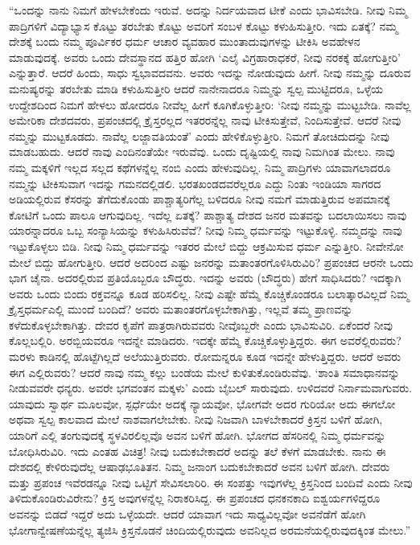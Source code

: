  “ಒಂದನ್ನು ನಾನು ನಿಮಗೆ ಹೇಳಬೇಕೆಂದು ಇರುವೆ. ಅದನ್ನು ನಿರ್ದಯವಾದ ಟೀಕೆ ಎಂದು ಭಾವಿಸಬೇಡಿ. ನೀವು ನಿಮ್ಮ ಪಾದ್ರಿಗಳಿಗೆ ವಿದ್ಯಾಭ್ಯಾಸ ಕೊಟ್ಟು ತರಬೇತು ಕೊಟ್ಟು ಅವರಿಗೆ ಸಂಬಳ ಕೊಟ್ಟು ಕಳುಹಿಸುತ್ತೀರಿ. ಇದು ಏತಕ್ಕೆ? ನಮ್ಮ ದೇಶಕ್ಕೆ ಬಂದು ನಮ್ಮ ಪೂರ್ವಿಕರ ಧರ್ಮ ಆಚಾರ ವ್ಯವಹಾರ ಮುಂತಾದುವುಗಳನ್ನು ಟೀಕಿಸಿ ಅವಹೇಳನ ಮಾಡುವುದಕ್ಕೆ. ಅವರು ಒಂದು ದೇವಸ್ಥಾನದ ಹತ್ತಿರ ಹೋಗಿ ‘ಎಲೈ ವಿಗ್ರಹಾರಾಧಕರೆ, ನೀವು ನರಕಕ್ಕೆ ಹೋಗುತ್ತೀರಿ’ ಎನ್ನುತ್ತಾರೆ. ಆದರೆ ಹಿಂದು, ಸಾಧು ಸ್ವಭಾವದವನು. ಅವರು ಇದನ್ನು ನೋಡುವುದು ಹೀಗೆ. ನೀವು ನಮ್ಮನ್ನು ದೂರುವ ಮನುಷ್ಯರನ್ನು ತರಬೇತು ಮಾಡಿ ಕಳುಹಿಸುತ್ತೀರಿ ಆದರೆ ನಾನೇನಾದರೂ ನಿಮ್ಮನ್ನು ಸ್ವಲ್ಪ ಮುಟ್ಟಿದರೂ, ಒಳ್ಳೆಯ ಉದ್ದೇಶದಿಂದ ನಿಮಗೆ ಹೇಳಲು ಹೋದರೂ ನೀವೆಲ್ಲ ಹೀಗೆ ಕೂಗಿಕೊಳ್ಳುತ್ತೀರಿ: ‘ನೀವು ನಮ್ಮನ್ನು ಮುಟ್ಟಬೇಡಿ. ನಾವೆಲ್ಲ ಅಮೇರಿಕಾ ದೇಶದವರು, ಪ್ರಪಂಚದಲ್ಲಿ ಕ್ರೈಸ್ತರಲ್ಲದ ಇತರರನ್ನೆಲ್ಲ ನಾವು ಟೀಕಿಸುತ್ತೇವೆ, ನಿಂದಿಸುತ್ತೇವೆ. ಆದರೆ ನೀವು ನಮ್ಮನ್ನು ಮುಟ್ಟಕೂಡದು. ನಾವೆಲ್ಲ ಲಜ್ಜಾವತಿಯಂತೆ’ ಎಂದು ಹೇಳಿಕೊಳ್ಳುತ್ತೀರಿ. ನಿಮಗೆ ತೋಚಿದುದನ್ನು ನೀವು ಮಾಡಬಹುದು. ಆದರೆ ನಾವು ಎಂದಿನಂತೆಯೇ ಇರುವೆವು. ಒಂದು ದೃಷ್ಟಿಯಲ್ಲಿ ನಾವು ನಿಮಗಿಂತ ಮೇಲು. ನಾವು ನಮ್ಮ ಮಕ್ಕಳಿಗೆ ಇಲ್ಲದ ಸಲ್ಲದ ಕಥೆಗಳನ್ನೆಲ್ಲ ನಂಬಿ ಎಂದು ಹೇಳುವುದಿಲ್ಲ. ನಿಮ್ಮ ಪಾದ್ರಿಗಳು ಯಾವಾಗಲಾದರೂ ನಮ್ಮನ್ನು ಟೀಕಿಸುವಾಗ ಇದನ್ನು ಗಮನದಲ್ಲಿಡಲಿ. ಭರತಖಂಡದವರೆಲ್ಲರೂ ಎದ್ದು ನಿಂತು ಇಂಡಿಯಾ ಸಾಗರದ ಅಡಿಯಲ್ಲಿರುವ ಕೆಸರನ್ನು ತೆಗೆದುಕೊಂಡು ಪಾಶ್ಚಾತ್ಯರಿಗೆಲ್ಲ ಬಳಿದರೂ ನೀವು ನಮಗೆ ಮಾಡುತ್ತಿರುವ ಅಪಮಾನಕ್ಕೆ ಕೋಟಿಗೆ ಒಂದು ಪಾಲೂ ಆಗುವುದಿಲ್ಲ. ಇದೆಲ್ಲ ಏತಕ್ಕೆ? ಪಾಶ್ಚಾತ್ಯ ದೇಶದ ಜನರ ಮತವನ್ನು ಬದಲಾಯಿಸಲು ನಾವು ಯಾರನ್ನಾದರೂ ಒಬ್ಬ ಸಂನ್ಯಾಸಿಯನ್ನು ಕಳುಹಿಸಿರುವೆವೆ? ನೀವು ನಿಮ್ಮ ಧರ್ಮವನ್ನು ಇಟ್ಟುಕೊಳ್ಳಿ. ನಮ್ಮದನ್ನು ನಾವು ಇಟ್ಟುಕೊಳ್ಳಲು ಬಿಡಿ. ನೀವು ನಿಮ್ಮ ಧರ್ಮವನ್ನು ಇತರರ ಮೇಲೆ ಬಿದ್ದು ಆಕ್ರಮಿಸುವ ಧರ್ಮ ಎನ್ನುತ್ತೀರಿ. ನೀವೇನೋ ಮೇಲೆ ಬಿದ್ದು ಹೋಗುತ್ತೀರಿ. ಆದರೆ ಅದರಿಂದ ಎಷ್ಟು ಜನರನ್ನು ಮತಾಂತರಗೊಳಿಸಿರುವಿರಿ? ಪ್ರಪಂಚದ ಆರನೇ ಒಂದು ಭಾಗ ಚೈನಾ. ಅದರಲ್ಲಿರುವ ಪ್ರತಿಯೊಬ್ಬರೂ ಬೌದ್ಧರು. ಇದನ್ನು ಅವರು (ಬೌದ್ಧರು) ಹೇಗೆ ಸಾಧಿಸಿದರು? ಇದಕ್ಕಾಗಿ ಅವರು ಒಂದು ಬಿಂದು ರಕ್ತವನ್ನೂ ಕೂಡ ಹರಿಸಲಿಲ್ಲ. ನೀವು ಎಷ್ಟೇ ಹೆಮ್ಮೆ ಕೊಚ್ಚಿಕೊಂಡರೂ ಬಲಾತ್ಕಾರವಿಲ್ಲದೆ ನಿಮ್ಮ ಕ್ರೈಸ್ತಧರ್ಮಎಲ್ಲಿ ಮುಂದೆ ಬಂದಿದೆ? ಅವರು ಮತಾಂತರಗೊಳ್ಳಬೇಕಾಗಿತ್ತು, ಇಲ್ಲವೆ ತಮ್ಮ ಪ್ರಾಣವನ್ನು ಕಳೆದುಕೊಳ್ಳಬೇಕಾಗಿತ್ತು. ದೇವರ ಕೃಪೆಗೆ ಪಾತ್ರರಾಗಿರುವವರು ನೀವೊಬ್ಬರೇ ಎಂದು ಭಾವಿಸುವಿರಿ. ಏಕೆಂದರೆ ನೀವು ಕೊಲ್ಲಬಲ್ಲಿರಿ. ಅರಬ್ಬಿಯವರೂ ಇದನ್ನೇ ಮಾಡಿದರು. ಇದಕ್ಕೇ ಹೆಮ್ಮೆ ಕೊಚ್ಚಿಕೊಳ್ಳುತ್ತಿದ್ದರು. ಈಗ ಅವರೆಲ್ಲಿರುವರು? ಮರಳು ಕಾಡಿನಲ್ಲಿ ಹೊಟ್ಟೆಗಿಲ್ಲದೆ ಅಲೆಯುತ್ತಿರುವರು. ರೋಮನ್ನರೂ ಕೂಡ ಇದನ್ನೇ ಹೇಳುತ್ತಿದ್ದರು. ಆದರೆ ಅವರು ಈಗ ಎಲ್ಲಿರುವರು? ಆದರೆ ನಾವು ನಮ್ಮ ಕಲ್ಲು ಬಂಡೆಯ ಮೇಲೆ ಕುಳಿತುಕೊಂಡಿರುವೆವು. ‘ಶಾಂತಿ ಸಮಾಧಾನವನ್ನು ನೀಡುವವರೇ ಧನ್ಯರು. ಅವರೇ ಭಗವಂತನ ಮಕ್ಕಳು’ ಎಂದು ಬೈಬಲ್ ಸಾರುವುದು. ಉಳಿದವರೆ ನಿರ್ನಾಮವಾಗುವರು. ಯಾವುದು ಸ್ವಾರ್ಥ ಮೂಲವೋ, ಸ್ಪರ್ಧೆಯೇ ಅದಕ್ಕೆ ನ್ಯಾಯವೋ, ಭೋಗವೇ ಅದರ ಗುರಿಯೋ ಅದು ಈಗಲೋ ಅಥವಾ ಸ್ವಲ್ಪ ಕಾಲವಾದ ಮೇಲೆ ನಾಶವಾಗಲೇಬೇಕು. ನೀವು ನಿಜವಾಗಿ ಬಾಳಬೇಕಾದರೆ ಕ್ರಿಸ್ತನ ಬಳಿಗೆ ಹೋಗಿ, ಯಾರಿಗೆ ಎಲ್ಲಿ ತಂಗುವುದಕ್ಕೆ ಸ್ಥಳವಿರಲಿಲ್ಲವೊ ಅವನ ಬಳಿಗೆ ಹೋಗಿ. ಭೋಗದ ಹೆಸರಿನಲ್ಲಿ ನಿಮ್ಮ ಧರ್ಮವನ್ನು ಬೋಧಿಸಿರುವಿರಿ. ಇದು ಎಂತಹ ವಿಚಿತ್ರ! ನೀವು ಬದುಕಬೇಕಾದರೆ ಅದನ್ನು ತಲೆ ಕೆಳಗೆ ಮಾಡಬೇಕು. ನಾನು ಈ ದೇಶದಲ್ಲಿ ಕೇಳಿರುವುದೆಲ್ಲ ಆಷಾಢಭೂತಿತನ. ನಿಮ್ಮ ಜನಾಂಗ ಬದುಕಬೇಕಾದರೆ ಅವನ ಬಳಿಗೆ ಹೋಗಿ. ದೇವರು ಮತ್ತು ಪ್ರಪಂಚ ಇವೆರಡನ್ನೂ ನೀವು ಒಟ್ಟಿಗೆ ಸೇವಿಸಲಾರಿರಿ. ಈ ಸಂಪತ್ತು ಇವುಗಳೆಲ್ಲ ಕ್ರಿಸ್ತನಿಂದ ಬಂದಿವೆ ಎಂದು ನೀವು ತಿಳಿದುಕೊಂಡಿರುವಿರೇನು? ಕ್ರಿಸ್ತ ಅವುಗಳನ್ನೆಲ್ಲ ನಿರಾಕರಿಸಿದ್ದ. ಈ ಪ್ರಪಂಚದ ಧನಕನಕಾದಿ ಐಶ್ವರ್ಯಗಳಿದ್ದರೂ ಅವನನ್ನು ಬಿಡದೆ ಇದ್ದರೆ ಅದು ಒಳ್ಳೆಯದೇ. ಆದರೆ ಯಾವಾಗ ಇದು ಸಾಧ್ಯವಿಲ್ಲವೋ ಅವನೆಡೆಗೆ ಹೋಗಿ ಭೋಗಾನ್ವೇಷಣೆಯನ್ನೆಲ್ಲ ತ್ಯಜಿಸಿ ಕ್ರಿಸ್ತನೊಡನೆ ಚಿಂದಿಯಲ್ಲಿರುವುದು ಅವನಿಲ್ಲದ ಅರಮನೆಯಲ್ಲಿರುವುದಕ್ಕಿಂತ ಮೇಲು.” 

